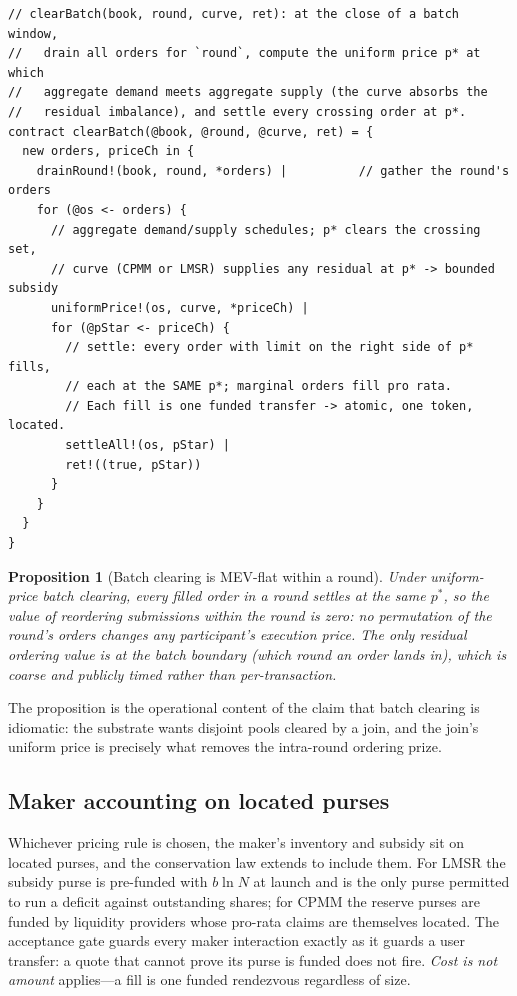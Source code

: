 \documentclass[11pt]{article}
\newtheorem{proposition}{Proposition}[section]
\begin{document}
\begin{lstlisting}[caption={Frequent batch auction: collect a round, compute one uniform
clearing price, settle all crossing orders against it (with a curve as residual
counterparty). Non-crossing orders never contend.},label={lst:batch}]
// clearBatch(book, round, curve, ret): at the close of a batch window,
//   drain all orders for `round`, compute the uniform price p* at which
//   aggregate demand meets aggregate supply (the curve absorbs the
//   residual imbalance), and settle every crossing order at p*.
contract clearBatch(@book, @round, @curve, ret) = {
  new orders, priceCh in {
    drainRound!(book, round, *orders) |          // gather the round's orders
    for (@os <- orders) {
      // aggregate demand/supply schedules; p* clears the crossing set,
      // curve (CPMM or LMSR) supplies any residual at p* -> bounded subsidy
      uniformPrice!(os, curve, *priceCh) |
      for (@pStar <- priceCh) {
        // settle: every order with limit on the right side of p* fills,
        // each at the SAME p*; marginal orders fill pro rata.
        // Each fill is one funded transfer -> atomic, one token, located.
        settleAll!(os, pStar) |
        ret!((true, pStar))
      }
    }
  }
}
\end{lstlisting}

\begin{proposition}[Batch clearing is MEV-flat within a round]
Under uniform-price batch clearing, every filled order in a round settles at the same $p^\ast$,
so the value of reordering submissions within the round is zero: no permutation of the round's
orders changes any participant's execution price. The only residual ordering value is at the
batch boundary (which round an order lands in), which is coarse and publicly timed rather than
per-transaction.
\end{proposition}

\noindent The proposition is the operational content of the claim that batch clearing is
idiomatic: the substrate wants disjoint pools cleared by a join, and the join's uniform price
is precisely what removes the intra-round ordering prize.

\subsection{Maker accounting on located purses}

Whichever pricing rule is chosen, the maker's inventory and subsidy sit on located purses, and
the conservation law extends to include them. For LMSR the subsidy purse is pre-funded with
$b\ln N$ at launch and is the only purse permitted to run a deficit against outstanding
shares; for CPMM the reserve purses are funded by liquidity providers whose pro-rata claims are
themselves located. The acceptance gate guards every maker interaction exactly as it guards a
user transfer: a quote that cannot prove its purse is funded does not fire. \emph{Cost is not
amount} applies---a fill is one funded rendezvous regardless of size.
\end{document}
